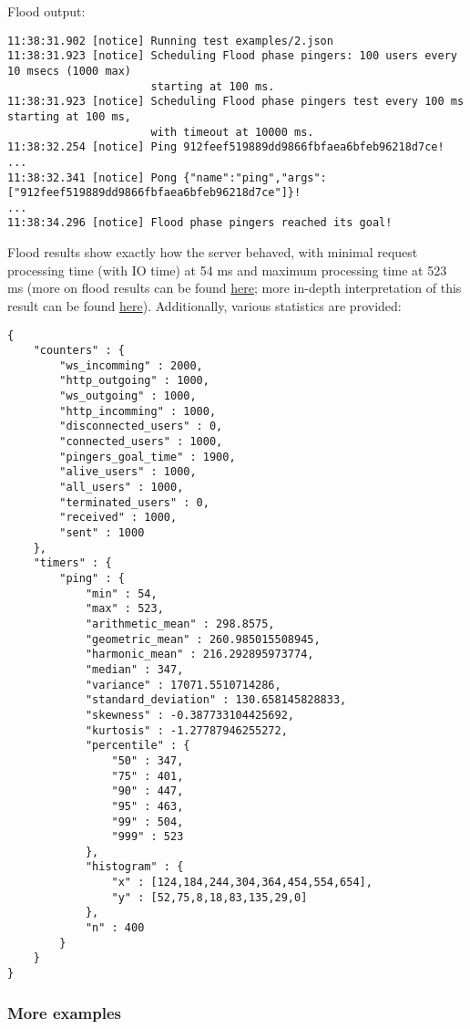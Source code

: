 \documentclass[a4paper]{article}
\begin{document}
\noindent
Flood output:


\begin{verbatim}
11:38:31.902 [notice] Running test examples/2.json
11:38:31.923 [notice] Scheduling Flood phase pingers: 100 users every 10 msecs (1000 max)
                      starting at 100 ms.
11:38:31.923 [notice] Scheduling Flood phase pingers test every 100 ms starting at 100 ms,
                      with timeout at 10000 ms.
11:38:32.254 [notice] Ping 912feef519889dd9866fbfaea6bfeb96218d7ce!
...
11:38:32.341 [notice] Pong {"name":"ping","args":["912feef519889dd9866fbfaea6bfeb96218d7ce"]}!
...
11:38:34.296 [notice] Flood phase pingers reached its goal!
\end{verbatim}



\noindent
Flood results show exactly how the server behaved, with minimal request processing time (with IO time) at 54 ms and maximum processing time at 523 ms (more on flood results can be found \hyperref[sec-4]{here}; more in-depth interpretation of this result can be found \hyperref[sec-4-4]{here}). Additionally, various statistics are provided:


\begin{verbatim}
{
    "counters" : {
        "ws_incomming" : 2000,
        "http_outgoing" : 1000,
        "ws_outgoing" : 1000,
        "http_incomming" : 1000,
        "disconnected_users" : 0,
        "connected_users" : 1000,
        "pingers_goal_time" : 1900,
        "alive_users" : 1000,
        "all_users" : 1000,
        "terminated_users" : 0,
        "received" : 1000,
        "sent" : 1000
    },
    "timers" : {
        "ping" : {
            "min" : 54,
            "max" : 523,
            "arithmetic_mean" : 298.8575,
            "geometric_mean" : 260.985015508945,
            "harmonic_mean" : 216.292895973774,
            "median" : 347,
            "variance" : 17071.5510714286,
            "standard_deviation" : 130.658145828833,
            "skewness" : -0.387733104425692,
            "kurtosis" : -1.27787946255272,
            "percentile" : {
                "50" : 347,
                "75" : 401,
                "90" : 447,
                "95" : 463,
                "99" : 504,
                "999" : 523
            },
            "histogram" : {
                "x" : [124,184,244,304,364,454,554,654],
                "y" : [52,75,8,18,83,135,29,0]
            },
            "n" : 400
        }
    }
}
\end{verbatim}
\subsubsection{More examples}
\label{sec-3-7-3}
\end{document}

